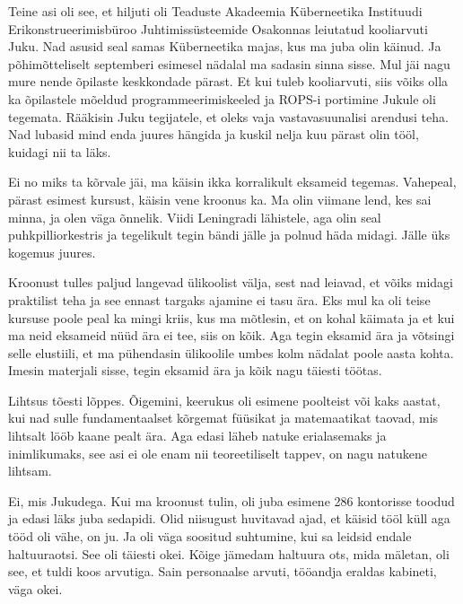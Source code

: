 Teine asi oli see, et  hiljuti oli Teaduste Akadeemia Küberneetika Instituudi 
Erikonstrueerimisbüroo Juhtimissüsteemide Osakonnas leiutatud kooliarvuti Juku. Nad asusid seal 
samas Küberneetika majas, kus ma juba olin käinud. Ja põhimõtteliselt 
septemberi esimesel nädalal ma sadasin sinna sisse. Mul jäi nagu mure nende 
õpilaste keskkondade pärast. Et kui tuleb kooliarvuti, siis võiks olla ka  
õpilastele mõeldud programmeerimiskeeled ja ROPS-i portimine 
Jukule oli tegemata. Rääkisin Juku tegijatele, et oleks vaja  vastavasuunalisi 
arendusi teha. Nad lubasid mind enda juures hängida ja kuskil nelja kuu pärast 
olin tööl, kuidagi nii ta läks. 


Ei no miks ta kõrvale jäi, ma käisin ikka korralikult eksameid tegemas. 
Vahepeal, pärast esimest kursust, käisin vene kroonus ka.  Ma olin viimane 
lend, kes sai minna, ja olen väga õnnelik. Viidi Leningradi lähistele, aga olin 
seal puhkpilliorkestris ja tegelikult tegin bändi jälle ja polnud häda midagi. 
Jälle üks kogemus juures. 

Kroonust tulles paljud langevad ülikoolist välja, sest nad leiavad, et võiks 
midagi praktilist teha ja see ennast targaks ajamine ei tasu ära. Eks mul ka 
oli teise kursuse poole peal ka mingi kriis, kus ma mõtlesin, et on kohal 
käimata ja et kui ma neid eksameid nüüd ära ei tee, siis on kõik. Aga tegin 
eksamid ära ja  võtsingi selle elustiili, et ma pühendasin ülikoolile umbes 
kolm nädalat poole aasta kohta. Imesin materjali sisse, tegin eksamid ära ja 
kõik nagu täiesti töötas. 


Lihtsus tõesti lõppes. Õigemini, keerukus oli esimene poolteist või kaks  
aastat,  kui nad sulle fundamentaalset kõrgemat füüsikat ja matemaatikat 
taovad, mis lihtsalt lööb kaane pealt ära. Aga edasi läheb natuke erialasemaks 
ja inimlikumaks, see asi ei ole enam nii teoreetiliselt tappev, on nagu 
natukene lihtsam. 


Ei, mis Jukudega. Kui ma kroonust tulin, oli juba esimene  286  kontorisse 
toodud ja edasi läks juba sedapidi. Olid niisugust huvitavad ajad, et käisid  
tööl küll aga tööd oli  vähe, on ju.  Ja oli väga soositud suhtumine, kui sa 
leidsid endale haltuuraotsi. See oli täiesti okei. Kõige jämedam haltuura ots, 
mida mäletan, oli see, et tuldi koos arvutiga. Sain personaalse arvuti, 
tööandja eraldas kabineti, väga okei. 

